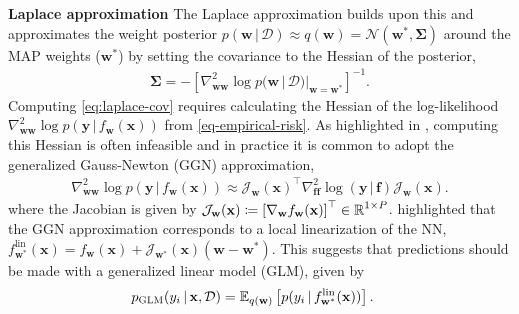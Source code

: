 \documentclass{article}
\newcommand{\weights}{\ensuremath{\mathbf{w}}}
\newcommand{\mbf}[1]{\mathbf{#1}}
\renewcommand{\mid}{\,|\,}
\newcommand{\vf}{\mbf{f}}
\newcommand{\vx}{\mbf{x}}
\newcommand{\vy}{\mbf{y}}
\newcommand{\vw}{\mbf{w}}
\newcommand{\Jac}[2]{\mathcal{J}_{#1}(#2)}
\begin{document}
\textbf{Laplace approximation}
The Laplace approximation \citet{mackayBayesian1992,daxberger2021laplace} builds upon this and approximates the weight posterior $p(\vw \mid \mathcal{D}) \approx q(\vw)= \mathcal{N}(\vw^{*} , \bm\Sigma)$
around the MAP weights ($\vw^{*}$) by setting the covariance to the Hessian of the posterior,
\begin{align} \label{eq:laplace-cov}
 \bm\Sigma = - \left[\nabla^{2}_{\vw\vw} \log p(\vw \mid \mathcal{D})  |_{\vw=\vw^{*}} \right]^{-1}.
\end{align}
Computing \cref{eq:laplace-cov} requires calculating the Hessian of the log-likelihood $\nabla^{2}_{\vw\vw} \log p(\vy \mid f_{\vw}(\vx))$ from \cref{eq-empirical-risk}.
As highlighted in \citet{immer2021improving}, computing this Hessian is often infeasible and in practice it is common to adopt the
generalized Gauss-Newton (GGN) approximation,
\begin{align}
 \nabla^{2}_{\vw\vw} \log p(\vy \mid f_{\vw}(\vx)) \approx \Jac{\vw}{\vx}^{\top} \nabla_{\vf\vf}^{2}\log(\vy\mid\vf) \Jac{\vw}{\vx}.
  \nonumber
\end{align}
where the Jacobian is given by $\Jac{\weights}{\vx} \coloneqq \left[ \nabla_\weights f_\weights(\vx)\right]^\top \in \R^{1 \times P}$.
\citet{immer2021improving} highlighted that the GGN approximation corresponds to a local linearization of the NN,
$f_{\weights^{*}}^{\text{lin}}(\vx) = f_{\weights}(\vx) + \Jac{\weights^{*}}{\vx}(\weights-\weights^{*})$.
This suggests that predictions should be made with a generalized linear model (GLM), given by
\begin{align} \label{eq-glm}
  p_{\text{\sc GLM}}(y_{i} \mid \vx, \mathcal{D}) &= \E_{q(\vw)} \left[ p(y_{i} \mid f_{\vw^{*}}^{\text{lin}}(\vx))\right]. %
\end{align}
\end{document}
